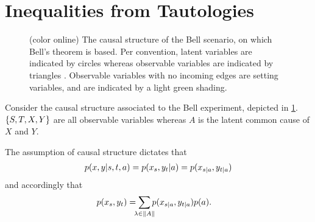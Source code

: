 \section{Inequalities from Tautologies}


\begin{figure}[b,t]
\caption{(color online) The causal structure of the Bell scenario, on which Bell's theorem is based. Per convention, latent variables are indicated by circles whereas observable variables are indicated by triangles \cite{pusey2014gdag}. Observable variables with no incoming edges are setting variables, and are indicated by a light green shading.}
 \label{fig:BellDAG}
\end{figure}

Consider the causal structure associated to the Bell experiment, depicted in \cref{fig:BellDAG}. $\left\lbrace S,T,X,Y\right\rbrace$ are all observable variables whereas $A$ is the latent common cause of $X$ and $Y$.

The assumption of causal structure dictates that
\begin{align}\begin{split}\label{eq:bellstructure}
p\lparen x,y|s,t,a\rparen=p\lparen x_s,y_t|a\rparen=p\lparen x_{s|a} , y_{t|a}\rparen
\end{split}\end{align}
and accordingly that
\begin{align}\begin{split}\label{eq:bellintegration}
&\p{x_s , y_t}
=\sum\limits_{\mathclap{\lambda\in \norm{A}}}\p{x_{s|a} , y_{t|a}}\p{a}.
\end{split}\end{align}

